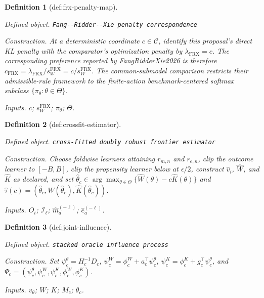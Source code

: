 \documentclass{article}
\newtheorem{definition}{Definition}
\begin{document}
\begin{definition}[def:frx-penalty-map]\label{def:frx-penalty-map}
\par\smallskip\noindent\emph{Defined object.} \texttt{Fang-\allowbreak{}-\allowbreak{}Ridder-\allowbreak{}-\allowbreak{}Xie penalty correspondence}
\par\smallskip\noindent\emph{Construction.} At a deterministic coordinate \(c\in\mathcal C\), identify this proposal's direct KL penalty with the comparator's optimization penalty by \(\lambda_{\mathrm{FRX}}=c\). The corresponding preference reported by FangRidderXie2026 is therefore \(c_{\mathrm{FRX}}=\lambda_{\mathrm{FRX}}/s_W^{\mathrm{FRX}}=c/s_W^{\mathrm{FRX}}\). The common-submodel comparison restricts their admissible-rule framework to the finite-action benchmark-centered softmax subclass \(\{\pi_\theta:\theta\in\Theta\}\).
\par\smallskip\noindent\emph{Inputs.} \(c\); \(s_W^{\mathrm{FRX}}\); \(\pi_\theta\); \(\Theta\).
\end{definition}

\begin{definition}[def:crossfit-estimator]\label{def:crossfit-estimator}
\par\smallskip\noindent\emph{Defined object.} \texttt{cross-\allowbreak{}fitted doubly robust frontier estimator}
\par\smallskip\noindent\emph{Construction.} Choose foldwise learners attaining \(r_{m,n}\) and \(r_{e,n}\), clip the outcome learner to \([-B,B]\), clip the propensity learner below at \(\epsilon/2\), construct \(\widehat v_i\), \(\widehat W\), and \(\widehat K\) as declared, and set \(\widehat\theta_c\in\arg\max_{\theta\in\Theta}\{\widehat W(\theta)-c\widehat K(\theta)\}\) and \(\widehat\tau(c)=(\widehat\theta_c,\widehat W(\widehat\theta_c),\widehat K(\widehat\theta_c))\).
\par\smallskip\noindent\emph{Inputs.} \(O_i\); \(\mathcal I_\ell\); \(\widehat m_a^{(-\ell)}\); \(\widehat e_a^{(-\ell)}\).
\end{definition}

\begin{definition}[def:joint-influence]\label{def:joint-influence}
\par\smallskip\noindent\emph{Defined object.} \texttt{stacked oracle influence process}
\par\smallskip\noindent\emph{Construction.} Set \(\psi^\theta_c=H_c^{-1}D_c\), \(\psi^W_c=\phi^W_c+a_c^\top\psi^\theta_c\), \(\psi^K_c=\phi^K_c+g_c^\top\psi^\theta_c\), and \(\Psi_c=(\psi^\theta_c,\psi^W_c,\psi^K_c,\phi^W_c,\phi^K_c)\).
\par\smallskip\noindent\emph{Inputs.} \(v_\theta\); \(W\); \(K\); \(M_c\); \(\theta_c\).
\end{definition}
\end{document}
